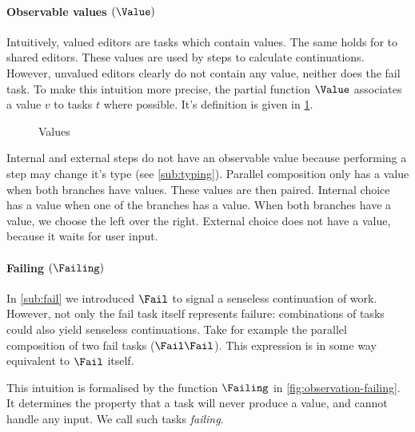 \paragraph{Observable values $(\Value)$}

Intuitively, valued editors are tasks which contain values.
The same holds for to shared editors.
These values are used by steps to calculate continuations.
However, unvalued editors clearly do not contain any value,
neither does the fail task.
To make this intuition more precise,
the partial function $\Value$ associates a value $v$ to tasks $t$ where possible.
It's definition is given in \cref{fig:observation-value}.

\begin{figure}[h]
  \small
  \caption{Values} \label{fig:observation-value}
\end{figure}

Internal and external steps do not have an observable value because performing a step may change it's type (see \cref{sub:typing}).
Parallel composition only has a value when both branches have values.
These values are then paired.
Internal choice has a value when one of the branches has a value.
When both branches have a value, we choose the left over the right.
External choice does not have a value, because it waits for user input.



\paragraph{Failing $(\Failing)$}

In \cref{sub:fail} we introduced $\Fail$ to signal a senseless continuation of work.
However, not only the fail task itself represents failure:
combinations of tasks could also yield senseless continuations.
Take for example the parallel composition of two fail tasks ($\Fail \And \Fail$).
This expression is in some way equivalent to $\Fail$ itself.

This intuition is formalised by the function $\Failing$ in \cref{fig:observation-failing}.
It determines the property that a task
will never produce a value, and
cannot handle any input.
We call such tasks \emph{failing}.

